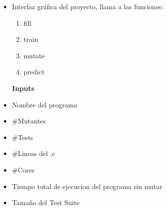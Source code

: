 \documentclass{article}
\begin{document}
\begin{itemize}
        \begin {itemize}
            \item Interfaz gráfica del proyecto, llama a las funciones:
            \begin{enumerate}
                \item fill
                \item train
                \item mutate
                \item predict
            \end{enumerate}
        \end{itemize}
\end{itemize}

\begin{itemize}
    \item [\textbf{Inputs}]
    \item Nombre del programa
    \item \#Mutantes
    \item \#Tests
    \item \#Lineas del .c
    \item \#Cores
    \item Tiempo total de ejecucion del programa sin mutar
    \item Tamaño del Test Suite
\end{itemize}
\end{document}
